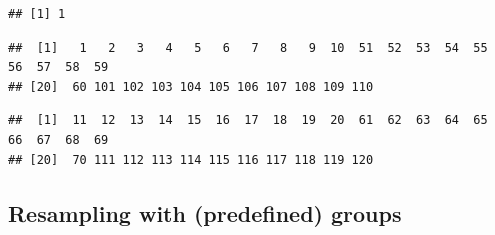 \documentclass[
]{scrbook}
\newenvironment{Shaded}{\begin{snugshade}}{\end{snugshade}}
\newcommand{\AttributeTok}[1]{\textcolor[rgb]{0.77,0.63,0.00}{#1}}
\newcommand{\DecValTok}[1]{\textcolor[rgb]{0.00,0.00,0.81}{#1}}
\newcommand{\FunctionTok}[1]{\textcolor[rgb]{0.00,0.00,0.00}{#1}}
\newcommand{\NormalTok}[1]{#1}
\newcommand{\OtherTok}[1]{\textcolor[rgb]{0.56,0.35,0.01}{#1}}
\newcommand{\SpecialCharTok}[1]{\textcolor[rgb]{0.00,0.00,0.00}{#1}}
\newcommand{\StringTok}[1]{\textcolor[rgb]{0.31,0.60,0.02}{#1}}
\renewenvironment{Shaded} {\begin{snugshade}\small} {\end{snugshade}}
\begin{document}
\begin{Shaded}
\end{Shaded}

\begin{verbatim}
## [1] 1
\end{verbatim}

\begin{Shaded}
\end{Shaded}

\begin{verbatim}
##  [1]   1   2   3   4   5   6   7   8   9  10  51  52  53  54  55  56  57  58  59
## [20]  60 101 102 103 104 105 106 107 108 109 110
\end{verbatim}

\begin{Shaded}
\end{Shaded}

\begin{verbatim}
##  [1]  11  12  13  14  15  16  17  18  19  20  61  62  63  64  65  66  67  68  69
## [20]  70 111 112 113 114 115 116 117 118 119 120
\end{verbatim}

\hypertarget{resampling-with-predefined-groups}{%
\subsection{Resampling with (predefined) groups}\label{resampling-with-predefined-groups}}
\end{document}
